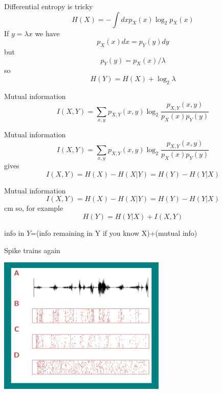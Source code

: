 \documentclass{beamer}
\begin{document}
\begin{frame}{Differential entropy is tricky}
  \color{dark}
$$
H(X)=-\int dx p_X(x)\log_2 {p_X(x)}
$$
\color{black}
If $y=\lambda x$ we have
\color{dark}
$$p_X(x)dx=p_Y(y)dy$$
\color{black}
but
\color{dark}
$$
p_Y(y)=p_X(x)/\lambda
$$
\color{black}
so
\color{dark}
$$
H(Y)= H(X)+\log_2{\lambda}
$$

\end{frame}

\begin{frame}{Mutual information}
\color{dark}
$$
I(X,Y)=\sum_{x,y} p_{X,Y}(x,y) \log_2{\frac{p_{X,Y}(x,y)}{p_X(x)p_Y(y)}}
$$
\color{black}
\end{frame}


\begin{frame}{Mutual information}
\color{dark}
$$
I(X,Y)=\sum_{x,y} p_{X,Y}(x,y) \log_2{\frac{p_{X,Y}(x,y)}{p_X(x)p_Y(y)}}
$$
\color{black}
gives
\color{dark}
$$
I(X,Y)=H(X)-H(X|Y)=H(Y)-H(Y|X)
$$
\color{black}
\end{frame}


\begin{frame}{Mutual information}
\color{dark}
$$
I(X,Y)=H(X)-H(X|Y)=H(Y)-H(Y|X)
$$
\color{black}
 cm
so, for example
\color{dark}
$$
H(Y)=H(Y|X)+I(X,Y)
$$
\color{black}
\begin{center}
info in $Y$=(info remaining in Y if you know X)+(mutual info)
\end{center}
\end{frame}



\begin{frame}{Spike trains again}
\color{reddish}
\begin{center}
\includegraphics[width=8cm]{SpikeTrains.png}
\end{center}
\end{frame}
\end{document}
